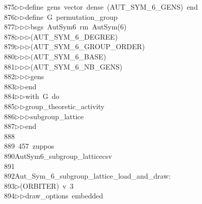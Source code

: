 \begin{tabbing}
875\>$\triangleright$\>$\triangleright$\>define\ gens\ vector\ dense\ (AUT\_SYM\_6\_GENS)\ end\ \\[0pt]
876\>$\triangleright$\>$\triangleright$\>define\ G\ permutation\_group\ \\[0pt]
877\>$\triangleright$\>$\triangleright$\>$\triangleright$\>bsgs\ AutSym6\ rm\ AutSym(6)\ \\[0pt]
878\>$\triangleright$\>$\triangleright$\>$\triangleright$\>(AUT\_SYM\_6\_DEGREE)\ \\[0pt]
879\>$\triangleright$\>$\triangleright$\>$\triangleright$\>(AUT\_SYM\_6\_GROUP\_ORDER)\ \\[0pt]
880\>$\triangleright$\>$\triangleright$\>$\triangleright$\>(AUT\_SYM\_6\_BASE)\ \\[0pt]
881\>$\triangleright$\>$\triangleright$\>$\triangleright$\>(AUT\_SYM\_6\_NB\_GENS)\ \\[0pt]
882\>$\triangleright$\>$\triangleright$\>$\triangleright$\>gens\ \\[0pt]
883\>$\triangleright$\>$\triangleright$\>end\ \\[0pt]
884\>$\triangleright$\>$\triangleright$\>with\ G\ do\ \\[0pt]
885\>$\triangleright$\>$\triangleright$\>group\_theoretic\_activity\ \\[0pt]
886\>$\triangleright$\>$\triangleright$\>$\triangleright$\>subgroup\_lattice\ \\[0pt]
887\>$\triangleright$\>$\triangleright$\>end\\[0pt]
888\>\\[0pt]
889\>\ 457\ zuppos\\[0pt]
890\>AutSym6\_subgroup\_latticecsv\\[0pt]
891\>\\[0pt]
892\>Aut\_Sym\_6\_subgroup\_lattice\_load\_and\_draw:\\[0pt]
893\>$\triangleright$\>(ORBITER)\ v\ 3\ \\[0pt]
894\>$\triangleright$\>$\triangleright$\>draw\_options\ embedded\ \\[0pt]

\end{tabbing}
